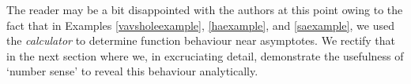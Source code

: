 {\begin{enumerate}
\end{enumerate}
}

\medskip

The reader may be a bit disappointed with the authors at this point owing to the fact that in Examples \ref{vavsholeexample}, \ref{haexample}, and \ref{saexample}, we used the \textit{calculator} to determine function behaviour near asymptotes.  We rectify that in the next section where we, in excruciating detail, demonstrate the usefulness of `number sense' to reveal this behaviour analytically.  


